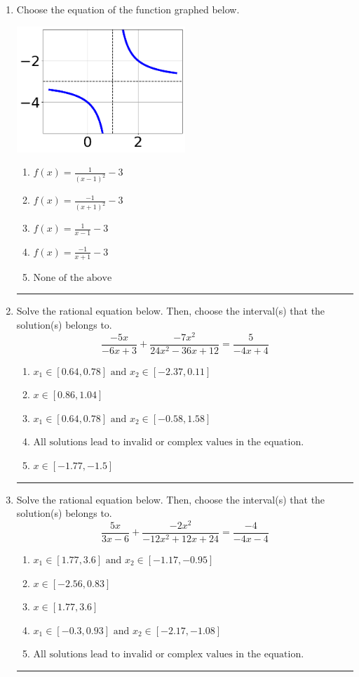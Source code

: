 \documentclass[14pt]{extbook}
\newcommand{\litem}[1]{\item#1\hspace*{-1cm}\rule{\textwidth}{0.4pt}}
\begin{document}
\begin{enumerate}
{\begin{enumerate}[label=\Alph*.]
\end{enumerate} }
\litem{
Choose the equation of the function graphed below.
\begin{center}
    \includegraphics[width=0.5\textwidth]{../Figures/rationalGraphToEquationCopyA.png}
\end{center}
\begin{enumerate}[label=\Alph*.]
\item \( f(x) = \frac{1}{(x - 1)^2} - 3 \)
\item \( f(x) = \frac{-1}{(x + 1)^2} - 3 \)
\item \( f(x) = \frac{1}{x - 1} - 3 \)
\item \( f(x) = \frac{-1}{x + 1} - 3 \)
\item \( \text{None of the above} \)

\end{enumerate} }
\litem{
Solve the rational equation below. Then, choose the interval(s) that the solution(s) belongs to.\[ \frac{-5x}{-6x + 3} + \frac{-7x^{2}}{24x^{2} -36 x + 12} = \frac{5}{-4x + 4} \]\begin{enumerate}[label=\Alph*.]
\item \( x_1 \in [0.64, 0.78] \text{ and } x_2 \in [-2.37,0.11] \)
\item \( x \in [0.86,1.04] \)
\item \( x_1 \in [0.64, 0.78] \text{ and } x_2 \in [-0.58,1.58] \)
\item \( \text{All solutions lead to invalid or complex values in the equation.} \)
\item \( x \in [-1.77,-1.5] \)

\end{enumerate} }
\litem{
Solve the rational equation below. Then, choose the interval(s) that the solution(s) belongs to.\[ \frac{5x}{3x -6} + \frac{-2x^{2}}{-12x^{2} +12 x + 24} = \frac{-4}{-4x -4} \]\begin{enumerate}[label=\Alph*.]
\item \( x_1 \in [1.77, 3.6] \text{ and } x_2 \in [-1.17,-0.95] \)
\item \( x \in [-2.56,0.83] \)
\item \( x \in [1.77,3.6] \)
\item \( x_1 \in [-0.3, 0.93] \text{ and } x_2 \in [-2.17,-1.08] \)
\item \( \text{All solutions lead to invalid or complex values in the equation.} \)

\end{enumerate} }
\end{enumerate}
\end{document}
